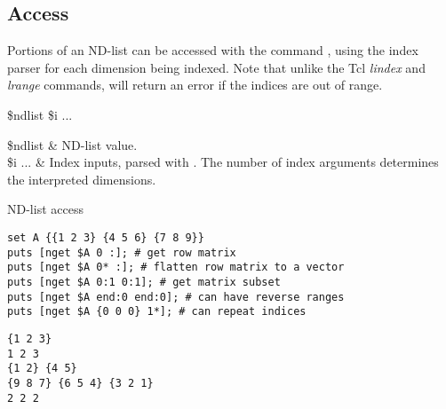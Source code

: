 \documentclass{article}
\begin{document}
\clearpage
\subsection{Access}
Portions of an ND-list can be accessed with the command , using the index parser  for each dimension being indexed.
Note that unlike the Tcl \textit{lindex} and \textit{lrange} commands,  will return an error if the indices are out of range.
\begin{syntax}
 \$ndlist \$i ...
\end{syntax}
\begin{args}
\$ndlist & ND-list value. \\
\$i ... & Index inputs, parsed with . 
The number of index arguments determines the interpreted dimensions.
\end{args}
\begin{example}{ND-list access}
\begin{lstlisting}
set A {{1 2 3} {4 5 6} {7 8 9}}
puts [nget $A 0 :]; # get row matrix
puts [nget $A 0* :]; # flatten row matrix to a vector
puts [nget $A 0:1 0:1]; # get matrix subset
puts [nget $A end:0 end:0]; # can have reverse ranges
puts [nget $A {0 0 0} 1*]; # can repeat indices
\end{lstlisting}
\tcblower
\begin{lstlisting}
{1 2 3}
1 2 3
{1 2} {4 5}
{9 8 7} {6 5 4} {3 2 1}
2 2 2
\end{lstlisting}
\end{example}

\clearpage
\end{document}
